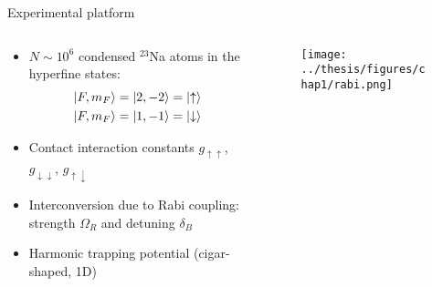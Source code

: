 \documentclass[aspectratio=169]{beamer}
\begin{document}


\begin{frame}{Experimental platform}
  \begin{columns}
    \begin{column}{0.5\textwidth}
      \begin{itemize}
        \item $N\sim10^6$ condensed $^{23}$Na atoms in the hyperfine states: 
        \begin{align*}
          &\ket{F,m_F} = \ket{2, -2} = \ket{\uparrow} \\
          &\ket{F,m_F} = \ket{1, -1} = \ket{\downarrow}
        \end{align*}
        \item Contact interaction constants $g_{\uparrow\uparrow}$, $g_{\downarrow\downarrow}$, $g_{\uparrow\downarrow}$
        \item Interconversion due to Rabi coupling: strength $\Omega_R$ and detuning $\delta_B$
        \item Harmonic trapping potential (cigar-shaped, 1D)
      \end{itemize}
    \end{column}
    \begin{column}{0.5\textwidth}
      \begin{figure}
        \centering
        \texttt{[image: ../thesis/figures/chap1/rabi.png]}
      \end{figure}
    \end{column}
  \end{columns}
\end{frame}
\end{document}
